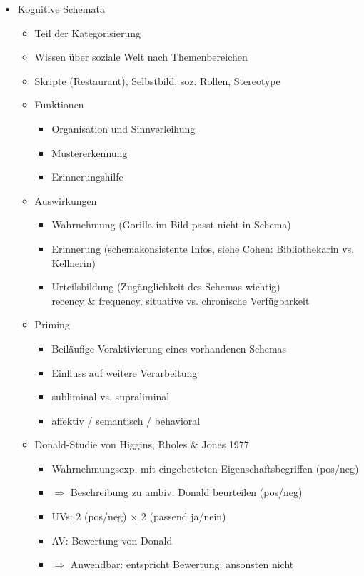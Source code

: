 \documentclass[11pt, paper=a4, twocolumn]{scrartcl}
\begin{document}
\begin{itemize}
			\item Kognitive Schemata
				\begin{itemize}
					\item Teil der Kategorisierung
					\item Wissen über soziale Welt nach Themenbereichen
					\item Skripte (Restaurant), Selbstbild, soz. Rollen, Stereotype
					\item Funktionen
						\begin{itemize}
							\item Organisation und Sinnverleihung
							\item Mustererkennung
							\item Erinnerungshilfe
						\end{itemize}
					\item Auswirkungen
						\begin{itemize}
							\item Wahrnehmung (Gorilla im Bild passt nicht in Schema)
							\item Erinnerung (schemakonsistente Infos, siehe Cohen: Bibliothekarin vs. Kellnerin)
							\item Urteilsbildung (Zugänglichkeit des Schemas wichtig)\\
								recency \& frequency, situative vs. chronische Verfügbarkeit
						\end{itemize}
					\item Priming
						\begin{itemize}
							\item Beiläufige Voraktivierung eines vorhandenen Schemas
							\item Einfluss auf weitere Verarbeitung
							\item subliminal vs. supraliminal
							\item affektiv / semantisch / behavioral
						\end{itemize}
					\item Donald-Studie von Higgins, Rholes \& Jones 1977
						\begin{itemize}
							\item Wahrnehmungsexp. mit eingebetteten Eigenschaftsbegriffen (pos/neg)
							\item $\Rightarrow$ Beschreibung zu ambiv. Donald beurteilen (pos/neg)
							\item UVs: 2 (pos/neg) $\times$ 2 (passend ja/nein)
							\item AV: Bewertung von Donald
							\item $\Rightarrow$ Anwendbar: entspricht Bewertung; ansonsten nicht
						\end{itemize}
				\end{itemize}


\end{itemize}
\end{document}
